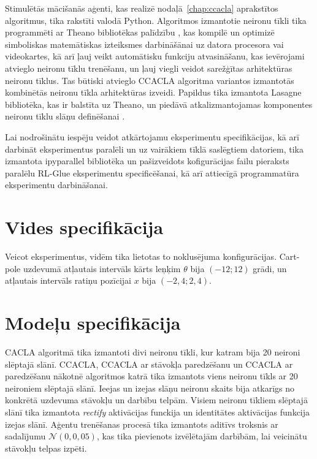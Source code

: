 \documentclass{ludis} %
\begin{document}
Stimulētās mācišanās aģenti, kas realizē nodaļā~\ref{chap:ccacla} aprakstītos
algoritmus, tika rakstīti valodā Python. Algoritmos izmantotie neironu tīkli
tika programmēti ar Theano bibliotēkas palīdzību \autocite{Bastien-Theano-2012}
\autocite{bergstra+al:2010-scipy}, kas kompilē un optimizē simboliskas
matemātiskas izteiksmes darbināšānai uz datora procesora vai videokartes, kā arī
ļauj veikt automātisku funkciju atvasināšanu, kas ievērojami atvieglo neironu
tīklu trenēšanu, un ļauj viegli veidot sarežģītas arhitektūras neironu tīklus.
Tas būtiski atvieglo CCACLA algoritma variantos izmantotās kombinētās neironu
tīkla arhitektūras izveidi. Papildus tika izmantota Lasagne bibliotēka, kas ir
balstīta uz Theano, un piedāvā atkalizmantojamas komponentes neironu tīklu slāņu
definēšanai \autocite{lasagne}.

Lai nodrošinātu iespēju veidot atkārtojamu eksperimentu specifikācijas, kā arī
darbināt eksperimentus paralēli un uz vairākiem tīklā saslēgtiem datoriem, tika
izmantota ipyparallel bibliotēka \autocite{ipyparallel} un pašizveidots
kofigurācijas failu pieraksts paralēlu RL-Glue eksperimentu specificēšanai, kā
arī attiecīgā programmatūra eksperimentu darbināšanai.

\section{Vides specifikācija}
Veicot eksperimentus, vidēm tika lietotas to noklusējuma konfigurācijas.
Cart-pole uzdevumā atļautais intervāls kārts leņķim $\theta$ bija $(-12; 12)$
grādi, un atļautais intervāls ratiņu pozīcijai $x$ bija $(-2,4; 2,4)$.


\section{Modeļu specifikācija}
CACLA algoritmā tika izmantoti divi neironu tīkli, kur katram bija 20
neironi slēptajā slānī. CCACLA, CCACLA ar stāvokļa paredzēšanu un CCACLA ar
paredzēšanu nākotnē algoritmos katrā tika izmantots viens neironu tīkls ar 20
neironiem slēptajā slānī. Ieejas un izejas slāņu neironu skaits bija atkarīgs no
konkrētā uzdevuma stāvokļu un darbību telpām. Visiem neironu tīkliem slēptajā
slānī tika izmantota \textit{rectify} aktivācijas funckija un identitātes
aktivācijas funkcija izejas slānī. Aģentu trenēšanas procesā tika izmantots
aditīvs troksnis ar sadalījumu $\mathcal{N}(0, 0,05)$, kas tika pievienots
izvēlētajām darbībām, lai veicinātu stāvokļu telpas izpēti.
\end{document}
